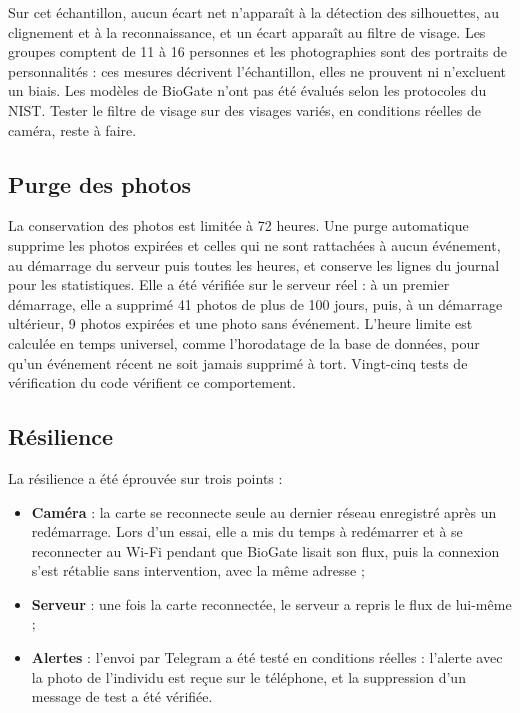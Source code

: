 \begin{maj}
Sur cet échantillon, aucun écart net n'apparaît à la détection des silhouettes, au clignement et à la reconnaissance, et un écart apparaît au filtre de visage. Les groupes comptent de 11 à 16 personnes et les photographies sont des portraits de personnalités : ces mesures décrivent l'échantillon, elles ne prouvent ni n'excluent un biais. Les modèles de BioGate n'ont pas été évalués selon les protocoles du NIST. Tester le filtre de visage sur des visages variés, en conditions réelles de caméra, reste à faire.
\end{maj}

\subsection{Purge des photos}

\begin{maj}
La conservation des photos est limitée à 72 heures. Une purge automatique supprime les photos expirées et celles qui ne sont rattachées à aucun événement, au démarrage du serveur puis toutes les heures, et conserve les lignes du journal pour les statistiques. Elle a été vérifiée sur le serveur réel : à un premier démarrage, elle a supprimé 41 photos de plus de 100 jours, puis, à un démarrage ultérieur, 9 photos expirées et une photo sans événement. L'heure limite est calculée en temps universel, comme l'horodatage de la base de données, pour qu'un événement récent ne soit jamais supprimé à tort. Vingt-cinq tests de vérification du code vérifient ce comportement.
\end{maj}

\subsection{Résilience}\label{sec:resilience}

\begin{maj}
La résilience a été éprouvée sur trois points :
\begin{itemize}
  \item \textbf{Caméra} : la carte se reconnecte seule au dernier réseau enregistré après un redémarrage. Lors d'un essai, elle a mis du temps à redémarrer et à se reconnecter au Wi-Fi pendant que BioGate lisait son flux, puis la connexion s'est rétablie sans intervention, avec la même adresse ;
  \item \textbf{Serveur} : une fois la carte reconnectée, le serveur a repris le flux de lui-même ;
  \item \textbf{Alertes} : l'envoi par Telegram a été testé en conditions réelles : l'alerte avec la photo de l'individu est reçue sur le téléphone, et la suppression d'un message de test a été vérifiée.
\end{itemize}
\end{maj}

